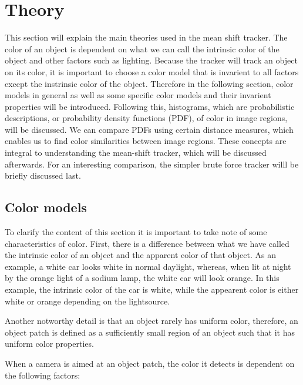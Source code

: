 \documentclass[a4paper,11pt]{article}
\begin{document}
\section{Theory}	

	This section will explain the main theories used in the mean shift tracker. The color of an object is dependent on what we can call the intrinsic color of the object and other factors such as lighting. Because the tracker will track an object on its color, it is important to choose a color model that is invarient to all factors except the instrinsic color of the object. Therefore in the following section, color models in general as well as some specific color models and their invarient properties will be introduced. Following this, histograms, which are probabilistic descriptions, or probability density functions (PDF), of color in image regions, will be discussed. We can compare PDFs using certain distance measures, which enables us to find color similarities between image regions. These concepts are integral to understanding the mean-shift tracker, which will be discussed afterwards. For an interesting comparison, the simpler brute force tracker willl be briefly discussed last.  






\subsection{Color models}

To clarify the content of this section it is important to take note of some characteristics of color. First, there is a difference between what we have called the intrinsic color of an object and the apparent color of that object. As an example, a white car looks white in normal daylight, whereas, when lit at night by the orange light of a sodium lamp, the white car will look orange. In this example, the intrinsic color of the car is white, while the appearent color is either white or orange depending on the lightsource.



Another notworthy detail is that an object rarely has uniform color, therefore, an object patch is defined as a sufficiently small region of an object such that it has uniform color properties. 



When a camera is aimed at an object patch, the color it detects is dependent on the following factors: 
\end{document}
